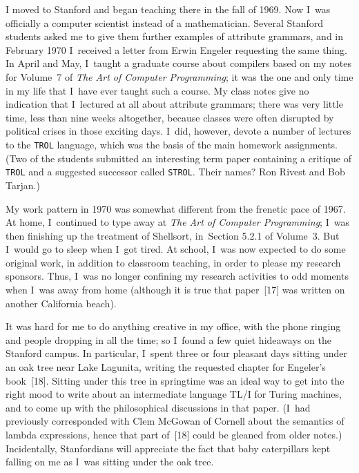 I moved to Stanford and began teaching there in the fall of 1969. Now
I~was officially a computer scientist instead of a mathematician.
Several Stanford students asked me to give them further examples of
attribute grammars, and in February 1970 I~received a letter from
Erwin Engeler requesting the same thing. In April and May, I~taught a
graduate course about compilers based on my notes for Volume~7 of {\sl
The Art of Computer Programming\/}; it was the one and only time in my
life that I~have ever taught such a course. My class notes give no
indication that I~lectured at all about attribute grammars; there was
very little time, less than nine weeks altogether, because classes
were often disrupted by political crises in those exciting days.
I~did, however, devote a number of lectures to the {\tt TROL}
language, which was
the basis of the main homework assignments. (Two of the students
submitted an interesting term paper containing a critique of {\tt
TROL}
and a suggested successor called {\tt STROL}. Their names? Ron Rivest
and Bob Tarjan.)

My work pattern in 1970 was somewhat different from the frenetic pace
of 1967. At home, I~continued to type away at {\sl The Art of Computer
Programming\/}; I~was then finishing up the treatment of Shellsort,
in~Section 5.2.1 of Volume~3. But I~would go to sleep when I~got tired.
At school, I~was now expected to do some original work, in addition to
classroom teaching, in order to please my research sponsors. Thus,
I~was no longer confining my research activities to odd moments when
I~was away from home (although it is true that paper~[17] was written
on another California beach).

It was hard for me to do anything creative in my office, with the
phone ringing and people dropping in all the time; so I~found a few
quiet hideaways on the Stanford campus. In particular, I~spent three
or four pleasant days sitting under an oak tree near Lake Lagunita,
writing the requested chapter for Engeler's book~[18].
Sitting under this tree in springtime was an ideal way to get into the
right mood to write about an intermediate language TL/I for Turing
machines, and to come up with the philosophical discussions in that
paper. (I~had previously corresponded with Clem McGowan of Cornell
about the semantics of lambda expressions, hence that part of~[18]
 could be gleaned from older notes.) Incidentally, Stanfordians
will appreciate the fact that baby caterpillars kept falling on me as
I~was sitting under the oak tree.

